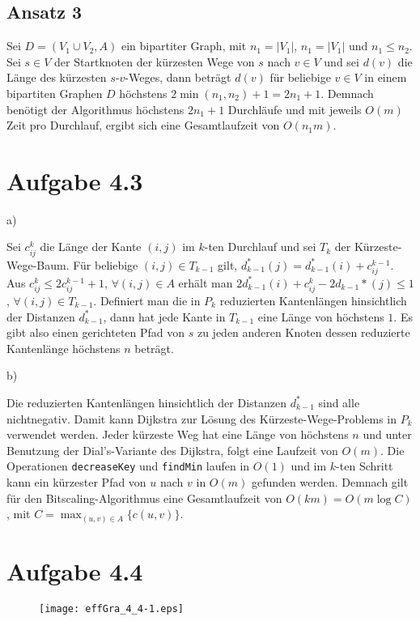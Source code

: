 \documentclass{scrartcl}
\begin{document}
\subsection*{Ansatz 3}

Sei $D= \left( V_{1} \cup V_{2}, A \right)$ ein bipartiter Graph, mit $n_{1} = \vert V_{1} \vert$, $n_{1} = \vert V_{1} \vert$ und $n_{1} \leq n_{2}$. Sei $s \in V$ der Startknoten der kürzesten Wege von $s$ nach $v \in V$ und sei $d(v)$ die Länge des kürzesten $s$-$v$-Weges, dann beträgt $d(v)$ für beliebige $v \in V$ in einem bipartiten Graphen $D$ höchstens $2 \min \left( n_{1}, n_{2} \right) + 1 = 2n_{1} + 1$. Demnach benötigt der Algorithmus höchstens $2n_{1} + 1$ Durchläufe und mit jeweils $O(m)$ Zeit pro Durchlauf, ergibt sich eine Gesamtlaufzeit von $O(n_{1}m)$.

\section{Aufgabe 4.3}
\begin{description}
\item[a)]
\end{description}
Sei $c_{ij}^{k}$ die Länge der Kante $(i,j)$ im $k$-ten Durchlauf und sei $T_{k}$ der Kürzeste-Wege-Baum. Für beliebige $(i,j) \in T_{k-1}$ gilt, $d_{k-1}^{*} (j) = d_{k-1}^{*} (i) + c_{ij}^{k-1}$. Aus $c_{ij}^{k} \leq 2c_{ij}^{k-1} + 1$, $\forall (i,j) \in A$ erhält man $2d_{k-1}^{*} (i) + c_{ij}^{k} - 2d_{k-1}{*} (j) \leq 1$, $\forall (i,j) \in T_{k-1}$. Definiert man die in $P_{k}$ reduzierten Kantenlängen hinsichtlich der Distanzen $d_{k-1}^{*}$, dann hat jede Kante in $T_{k-1}$ eine Länge von höchstens $1$. Es gibt also einen gerichteten Pfad von $s$ zu jeden anderen Knoten dessen reduzierte Kantenlänge höchstens $n$ beträgt.

\begin{description}
\item[b)]
\end{description}
Die reduzierten Kantenlängen hinsichtlich der Distanzen $d_{k-1}^{*}$ sind alle nichtnegativ. Damit kann Dijkstra  zur Lösung des Kürzeste-Wege-Problems in $P_{k}$ verwendet werden. Jeder kürzeste Weg hat eine Länge von höchstens $n$ und unter Benutzung der Dial's-Variante des Dijkstra, folgt eine Laufzeit von $O(m)$. Die Operationen \verb+decreaseKey+ und \verb+findMin+ laufen in $O(1)$ und im $k$-ten Schritt kann ein kürzester Pfad von $u$ nach $v$ in $O(m)$ gefunden werden. Demnach gilt für den Bitscaling-Algorithmus eine Gesamtlaufzeit von $O(km) = O(m \log C)$, mit $C = \max_{(u,v) \in A} \lbrace c(u,v) \rbrace$.

\section{Aufgabe 4.4}
\begin{center}
\begin{figure}[h]
\texttt{[image: effGra\_4\_4-1.eps]}
\end{figure}
\end{center}
\end{document}
